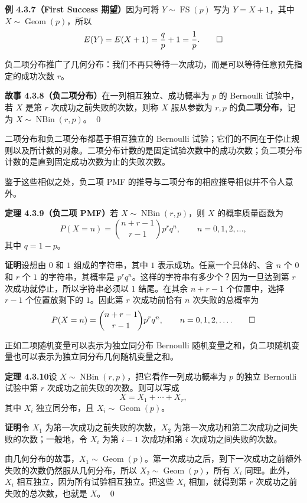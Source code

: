 \documentclass[UTF8,12pt,a4paper,fontset=fandol]{ctexart}
\begin{document}
\noindent\textbf{例 4.3.7（First Success 期望）}\quad 因为可将 $Y\sim\operatorname{FS}(p)$ 写为 $Y=X+1$，其中 $X\sim\operatorname{Geom}(p)$，所以
\[
  E(Y)=E(X+1)=\frac{q}{p}+1=\frac{1}{p}. \qed
\]

负二项分布推广了几何分布：我们不再只等待一次成功，而是可以等待任意预先指定的成功次数 $r$。

\noindent\textbf{故事 4.3.8（负二项分布）}\quad 在一列相互独立、成功概率为 $p$ 的 Bernoulli 试验中，若 $X$ 是第 $r$ 次成功之前失败的次数，则称 $X$ 服从参数为 $r,p$ 的\textbf{负二项分布}，记为 $X\sim\operatorname{NBin}(r,p)$。 \qed

二项分布和负二项分布都基于相互独立的 Bernoulli 试验；它们的不同在于停止规则以及所计数的对象。二项分布计数的是固定试验次数中的成功次数；负二项分布计数的是直到固定成功次数为止的失败次数。

鉴于这些相似之处，负二项 PMF 的推导与二项分布的相应推导相似并不令人意外。

\noindent\textbf{定理 4.3.9（负二项 PMF）}\quad 若 $X\sim\operatorname{NBin}(r,p)$，则 $X$ 的概率质量函数为
\[
  P(X=n)=\binom{n+r-1}{r-1}p^rq^n,\qquad n=0,1,2,\ldots,
\]
其中 $q=1-p$。

\noindent\textbf{证明}\quad 设想由 $0$ 和 $1$ 组成的字符串，其中 $1$ 表示成功。任意一个具体的、含 $n$ 个 $0$ 和 $r$ 个 $1$ 的字符串，其概率是 $p^rq^n$。这样的字符串有多少个？因为一旦达到第 $r$ 次成功就停止，所以字符串必须以 $1$ 结尾。在其余 $n+r-1$ 个位置中，选择 $r-1$ 个位置放剩下的 $1$。因此第 $r$ 次成功前恰有 $n$ 次失败的总概率为
\[
  P(X=n)=\binom{n+r-1}{r-1}p^rq^n,\qquad n=0,1,2,\ldots. \qed
\]

正如二项随机变量可以表示为独立同分布 Bernoulli 随机变量之和，负二项随机变量也可以表示为独立同分布几何随机变量之和。

\noindent\textbf{定理 4.3.10}\quad 设 $X\sim\operatorname{NBin}(r,p)$，把它看作一列成功概率为 $p$ 的独立 Bernoulli 试验中第 $r$ 次成功之前失败的次数。则可以写成
\[
  X=X_1+\cdots+X_r,
\]
其中 $X_i$ 独立同分布，且 $X_i\sim\operatorname{Geom}(p)$。

\noindent\textbf{证明}\quad 令 $X_1$ 为第一次成功之前失败的次数，$X_2$ 为第一次成功和第二次成功之间失败的次数；一般地，令 $X_i$ 为第 $i-1$ 次成功和第 $i$ 次成功之间失败的次数。

由几何分布的故事，$X_1\sim\operatorname{Geom}(p)$。第一次成功之后，到下一次成功之前额外失败的次数仍然服从几何分布，所以 $X_2\sim\operatorname{Geom}(p)$，所有 $X_i$ 同理。此外，$X_i$ 相互独立，因为所有试验相互独立。把这些 $X_i$ 相加，就得到第 $r$ 次成功之前失败的总次数，也就是 $X$。 \qed
\end{document}
